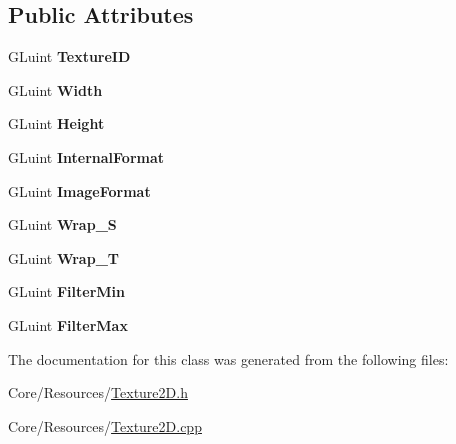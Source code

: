 \subsection*{Public Attributes}
\begin{DoxyCompactItemize}
\item 
\hypertarget{classDCEngine_1_1Texture2D_aa3e04eda94484ed041aec9ebea160add}{G\-Luint {\bfseries Texture\-I\-D}}\label{classDCEngine_1_1Texture2D_aa3e04eda94484ed041aec9ebea160add}

\item 
\hypertarget{classDCEngine_1_1Texture2D_a85720e43216503e14dc64a7eb33302e1}{G\-Luint {\bfseries Width}}\label{classDCEngine_1_1Texture2D_a85720e43216503e14dc64a7eb33302e1}

\item 
\hypertarget{classDCEngine_1_1Texture2D_adafde0965c71524a5be13d2197bb0cf7}{G\-Luint {\bfseries Height}}\label{classDCEngine_1_1Texture2D_adafde0965c71524a5be13d2197bb0cf7}

\item 
\hypertarget{classDCEngine_1_1Texture2D_a97c33e1f23576d412daea260de6e4b9a}{G\-Luint {\bfseries Internal\-Format}}\label{classDCEngine_1_1Texture2D_a97c33e1f23576d412daea260de6e4b9a}

\item 
\hypertarget{classDCEngine_1_1Texture2D_a4163dc375e9d9b1d11b4e6416b132d6b}{G\-Luint {\bfseries Image\-Format}}\label{classDCEngine_1_1Texture2D_a4163dc375e9d9b1d11b4e6416b132d6b}

\item 
\hypertarget{classDCEngine_1_1Texture2D_ac5c86cea176be29ca068edecd42922b7}{G\-Luint {\bfseries Wrap\-\_\-\-S}}\label{classDCEngine_1_1Texture2D_ac5c86cea176be29ca068edecd42922b7}

\item 
\hypertarget{classDCEngine_1_1Texture2D_ae38eebbc7360c02246915cbc27cb0d6d}{G\-Luint {\bfseries Wrap\-\_\-\-T}}\label{classDCEngine_1_1Texture2D_ae38eebbc7360c02246915cbc27cb0d6d}

\item 
\hypertarget{classDCEngine_1_1Texture2D_a05785b7b34091ca778a78f647b98d851}{G\-Luint {\bfseries Filter\-Min}}\label{classDCEngine_1_1Texture2D_a05785b7b34091ca778a78f647b98d851}

\item 
\hypertarget{classDCEngine_1_1Texture2D_acf9ea5201db06678880b78519f73f7de}{G\-Luint {\bfseries Filter\-Max}}\label{classDCEngine_1_1Texture2D_acf9ea5201db06678880b78519f73f7de}

\end{DoxyCompactItemize}


The documentation for this class was generated from the following files\-:\begin{DoxyCompactItemize}
\item 
Core/\-Resources/\hyperlink{Texture2D_8h}{Texture2\-D.\-h}\item 
Core/\-Resources/\hyperlink{Texture2D_8cpp}{Texture2\-D.\-cpp}\end{DoxyCompactItemize}
